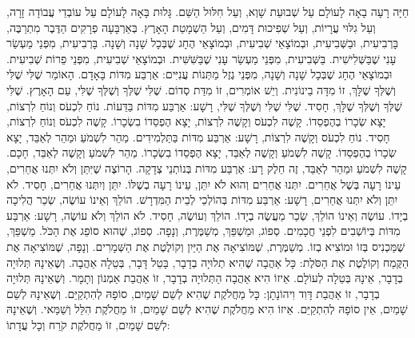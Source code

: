 חַיָּה רָעָה בָאָה לָעוֹלָם עַל שְׁבוּעַת שָׁוְא, וְעַל חִלּוּל הַשֵּׁם. גָּלוּת בָּאָה לָעוֹלָם עַל עוֹבְדֵי עֲבוֹדָה זָרָה, וְעַל גִלּוּי עֲרָיוֹת, וְעַל שְׁפִיכוּת דָּמִים, וְעַל הַשְׁמָטַת הָאָרֶץ. בְּאַרְבָּעָה פְרָקִים הַדֶּבֶר מִתְרַבֶּה, בָּרְבִיעִית, וּבַשְּׁבִיעִית, וּבְמוֹצָאֵי שְׁבִיעִית, וּבְמוֹצָאֵי הֶחָג שֶׁבְּכָל שָׁנָה וְשָׁנָה. בָּרְבִיעִית, מִפְּנֵי מַעְשַׂר עָנִי שֶׁבַּשְּׁלִישִׁית. בַּשְּׁבִיעִית, מִפְּנֵי מַעְשַׂר עָנִי שֶׁבַּשִּׁשִּׁית. וּבְמוֹצָאֵי שְׁבִיעִית, מִפְּנֵי פֵרוֹת שְׁבִיעִית. וּבְמוֹצָאֵי הֶחָג שֶׁבְּכָל שָׁנָה וְשָׁנָה, מִפְּנֵי גֶזֶל מַתְּנוֹת עֲנִיִּים:
אַרְבַּע מִדּוֹת בָּאָדָם. הָאוֹמֵר שֶׁלִּי שֶׁלִּי וְשֶׁלְּךָ שֶׁלָּךְ, זוֹ מִדָּה בֵינוֹנִית. וְיֵשׁ אוֹמְרִים, זוֹ מִדַּת סְדוֹם. שֶׁלִּי שֶׁלְּךָ וְשֶׁלְּךָ שֶׁלִּי, עַם הָאָרֶץ. שֶׁלִּי שֶׁלְּךָ וְשֶׁלְּךָ שֶׁלָּךְ, חָסִיד. שֶׁלִּי שֶׁלִּי וְשֶׁלְּךָ שֶׁלִּי, רָשָׁע:
אַרְבַּע מִדּוֹת בַּדֵּעוֹת. נוֹחַ לִכְעֹס וְנוֹחַ לִרְצוֹת, יָצָא שְׂכָרוֹ בְהֶפְסֵדוֹ. קָשֶׁה לִכְעֹס וְקָשֶׁה לִרְצוֹת, יָצָא הֶפְסֵדוֹ בִשְׂכָרוֹ. קָשֶׁה לִכְעֹס וְנוֹחַ לִרְצוֹת, חָסִיד. נוֹחַ לִכְעֹס וְקָשֶׁה לִרְצוֹת, רָשָׁע:
אַרְבַּע מִדּוֹת בַּתַּלְמִידִים. מַהֵר לִשְׁמֹעַ וּמַהֵר לְאַבֵּד, יָצָא שְׂכָרוֹ בְהֶפְסֵדוֹ. קָשֶׁה לִשְׁמֹעַ וְקָשֶׁה לְאַבֵּד, יָצָא הֶפְסֵדוֹ בִשְׂכָרוֹ. מַהֵר לִשְׁמֹעַ וְקָשֶׁה לְאַבֵּד, חָכָם. קָשֶׁה לִשְׁמֹעַ וּמַהֵר לְאַבֵּד, זֶה חֵלֶק רָע:
אַרְבַּע מִדּוֹת בְּנוֹתְנֵי צְדָקָה. הָרוֹצֶה שֶׁיִּתֵּן וְלֹא יִתְּנוּ אֲחֵרִים, עֵינוֹ רָעָה בְּשֶׁל אֲחֵרִים. יִתְּנוּ אֲחֵרִים וְהוּא לֹא יִתֵּן, עֵינוֹ רָעָה בְשֶׁלּוֹ. יִתֵּן וְיִתְּנוּ אֲחֵרִים, חָסִיד. לֹא יִתֵּן וְלֹא יִתְּנוּ אֲחֵרִים, רָשָׁע:
אַרְבַּע מִדּוֹת בְּהוֹלְכֵי לְבֵית הַמִּדְרָשׁ. הוֹלֵךְ וְאֵינוֹ עוֹשֶׂה, שְׂכַר הֲלִיכָה בְיָדוֹ. עוֹשֶׂה וְאֵינוֹ הוֹלֵךְ, שְׂכַר מַעֲשֶׂה בְיָדוֹ. הוֹלֵךְ וְעוֹשֶׂה, חָסִיד. לֹא הוֹלֵךְ וְלֹא עוֹשֶׂה, רָשָׁע:
אַרְבַּע מִדּוֹת בְּיוֹשְׁבִים לִפְנֵי חֲכָמִים. סְפוֹג, וּמַשְׁפֵּךְ, מְשַׁמֶּרֶת, וְנָפָה. סְפוֹג, שֶׁהוּא סוֹפֵג אֶת הַכֹּל. מַשְׁפֵּךְ, שֶׁמַּכְנִיס בְּזוֹ וּמוֹצִיא בְזוֹ. מְשַׁמֶּרֶת, שֶׁמּוֹצִיאָה אֶת הַיַּיִן וְקוֹלֶטֶת אֶת הַשְּׁמָרִים. וְנָפָה, שֶׁמּוֹצִיאָה אֶת הַקֶּמַח וְקוֹלֶטֶת אֶת הַסֹּלֶת:
כָּל אַהֲבָה שֶׁהִיא תְלוּיָה בְדָבָר, בָּטֵל דָּבָר, בְּטֵלָה אַהֲבָה. וְשֶׁאֵינָהּ תְּלוּיָה בְדָבָר, אֵינָהּ בְּטֵלָה לְעוֹלָם. אֵיזוֹ הִיא אַהֲבָה הַתְּלוּיָה בְדָבָר, זוֹ אַהֲבַת אַמְנוֹן וְתָמָר. וְשֶׁאֵינָהּ תְּלוּיָה בְדָבָר, זוֹ אַהֲבַת דָּוִד וִיהוֹנָתָן:
כָּל מַחֲלֹקֶת שֶׁהִיא לְשֵׁם שָׁמַיִם, סוֹפָהּ לְהִתְקַיֵּם. וְשֶׁאֵינָהּ לְשֵׁם שָׁמַיִם, אֵין סוֹפָהּ לְהִתְקַיֵּם. אֵיזוֹ הִיא מַחֲלֹקֶת שֶׁהִיא לְשֵׁם שָׁמַיִם, זוֹ מַחֲלֹקֶת הִלֵּל וְשַׁמַּאי. וְשֶׁאֵינָהּ לְשֵׁם שָׁמַיִם, זוֹ מַחֲלֹקֶת קֹרַח וְכָל עֲדָתוֹ:
